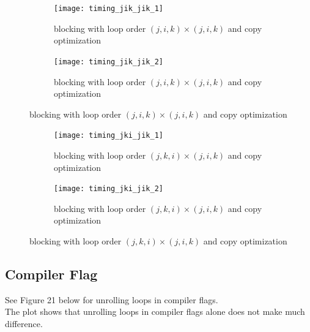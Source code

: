 \documentclass[12pt]{article}
\numberwithin{equation}{section}
\begin{document}
\begin{figure}[!ht]
   \begin{subfigure}
      \centering
        \begin{center}
      \texttt{[image: timing\_jik\_jik\_1]}
        \end{center}
      \label{aload0}
      \caption{blocking with loop order $(j, i, k)\times(j, i, k)$ and copy optimization}
  \end{subfigure}
  \begin{subfigure}
      \centering
        \begin{center}
      \texttt{[image: timing\_jik\_jik\_2]}
        \end{center}
      \label{aload1}
      \caption{blocking with loop order $(j, i, k)\times(j, i, k)$ and copy optimization}
  \end{subfigure}

\end{figure}

\begin{figure}[!ht]
   \begin{subfigure}
      \centering
        \begin{center}
      \texttt{[image: timing\_jki\_jik\_1]}
        \end{center}
      \label{aload0}
      \caption{blocking with loop order $(j, k, i)\times(j, i, k)$ and copy optimization}
  \end{subfigure}
  \begin{subfigure}
      \centering
        \begin{center}
      \texttt{[image: timing\_jki\_jik\_2]}
        \end{center}
      \label{aload1}
      \caption{blocking with loop order $(j, k, i)\times(j, i, k)$ and copy optimization}
  \end{subfigure}

\end{figure}





\subsection{Compiler Flag}

See Figure 21 below for unrolling loops in compiler flags.
\\
The plot shows that unrolling loops in compiler flags alone does not make much difference.
\end{document}
